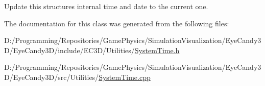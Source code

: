 Update this structures internal time and date to the current one. 



The documentation for this class was generated from the following files\+:\begin{DoxyCompactItemize}
\item 
D\+:/\+Programming/\+Repositories/\+Game\+Physics/\+Simulation\+Visualization/\+Eye\+Candy3\+D/\+Eye\+Candy3\+D/include/\+E\+C3\+D/\+Utilities/\mbox{\hyperlink{_system_time_8h}{System\+Time.\+h}}\item 
D\+:/\+Programming/\+Repositories/\+Game\+Physics/\+Simulation\+Visualization/\+Eye\+Candy3\+D/\+Eye\+Candy3\+D/src/\+Utilities/\mbox{\hyperlink{_system_time_8cpp}{System\+Time.\+cpp}}\end{DoxyCompactItemize}
